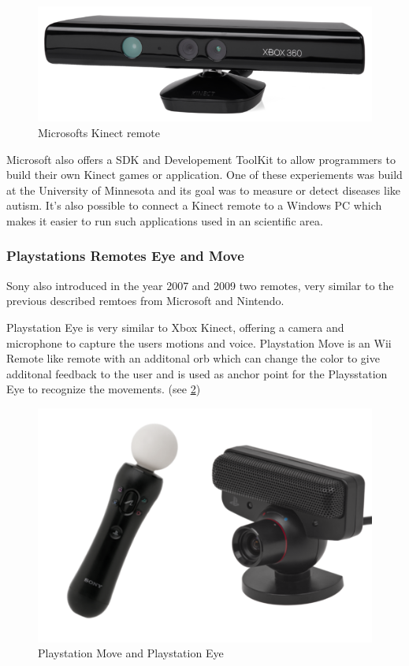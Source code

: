 \documentclass[a4paper,11pt]{article}
\begin{document}
\begin{figure}[ht]
\begin{center}
\includegraphics[width=12cm]{images/stateoftheart/kinect.png}
\caption{Microsofts Kinect remote}
\label{fig:kinect}
\end{center}
\end{figure}

Microsoft also offers a SDK and Developement ToolKit to allow programmers to build their own Kinect games or application. One of these experiements was build at the University of Minnesota and its goal was to measure or detect diseases like autism. It's also possible to connect a Kinect remote to a Windows PC which makes it easier to run such applications used in an scientific area.

\subsubsection{Playstations Remotes Eye and Move}
\label{sect:star:eyemove}
Sony also introduced in the year 2007 and 2009 two remotes, very similar to the previous described remtoes from Microsoft and Nintendo.

Playstation Eye is very similar to Xbox Kinect, offering a camera and microphone to capture the users motions and voice.
Playstation Move is an Wii Remote like remote with an additonal orb which can change the color to give additonal feedback to the user and is used as anchor point for the Playsstation Eye to recognize the movements. (see \ref{fig:playstationeyeandmove})

\begin{figure}[ht]
\begin{center}
\includegraphics[width=12cm]{images/stateoftheart/playstationeyeandmove.png}
\caption{Playstation Move and Playstation Eye}
\label{fig:playstationeyeandmove}
\end{center}
\end{figure}
\end{document}
